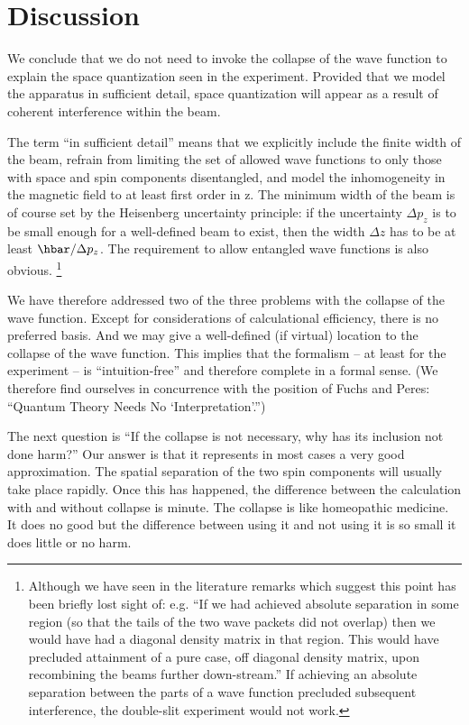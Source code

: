 \documentclass[aps,prl,superscriptaddress,12pt]{revtex4-2}
\begin{document}
\section{Discussion}

We conclude that we do not need to invoke the collapse of the wave function 
	to explain the space quantization seen in the \sg experiment. 
Provided that we model the apparatus in sufficient detail, 
	space quantization will appear as a result of coherent interference within the beam.

The term ``in sufficient detail'' means that we explicitly include the finite width of the beam, 
refrain from limiting the set of allowed wave functions to only those with space and spin components disentangled, 
and model the inhomogeneity in the magnetic field to at least first order in z. 
The minimum width of the beam is of course set by the Heisenberg uncertainty principle: 
if the uncertainty $\Delta p_z$  is to be small enough for a well-defined beam to exist, 
then the width $\Delta z$ has to be at least  
${\hbar  \mathord{\left/ {\vphantom {\hbar  {\Delta p_z}}} \right. \kern-\nulldelimiterspace} {\Delta p_z}}$. 
The requirement to allow entangled wave functions is also obvious.
\footnote{Although we have seen in the literature remarks which suggest this point has been briefly lost sight of: 
	e.g. ``If we had achieved absolute separation in some region 
		(so that the tails of the two wave packets did not overlap)
		then we would have had a diagonal density matrix in that region. 
	This would have precluded attainment of a pure case, off diagonal density matrix, 
		upon recombining the beams further down-stream.''\cite{Scully:1978} 
	If achieving an absolute separation between the parts of a wave function 
		precluded subsequent interference, 
		the double-slit experiment would not work.}

We have therefore addressed two of the three problems with the collapse of the wave function. 
Except for considerations of calculational efficiency, there is no preferred basis. 
And we may give a well-defined (if virtual) location to the collapse of the wave function. 
This implies that the formalism 
-- at least for the \sg experiment 
-- is ``intuition-free'' and therefore complete in a formal sense.
(We therefore find ourselves in concurrence 
	with the position of Fuchs and Peres\cite{Fuchs:2000}: 
	``Quantum Theory Needs No `Interpretation'.'')

The next question is ``If the collapse is not necessary, why has its inclusion not done harm?''
Our answer is that it represents in most cases a very good approximation. The spatial separation of the two spin components will usually take place rapidly. 
Once this has happened, the difference between the calculation with and without collapse is minute. 
The collapse is like homeopathic medicine. 
It does no good but the difference between using it and not using it is so small it does little or no harm.
\end{document}
